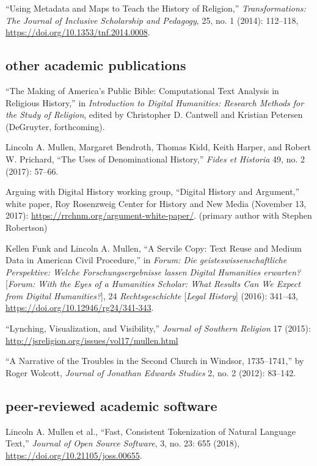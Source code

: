\documentclass[11pt]{article}
\begin{document}
``Using Metadata and Maps to Teach the History of Religion,'' \emph{Transformations: The Journal of Inclusive Scholarship and Pedagogy}, 25, no. 1 (2014): 112--118, \url{https://doi.org/10.1353/tnf.2014.0008}.

\subsection{other academic publications}\label{other-academic}

``The Making of America's Public Bible: Computational Text Analysis in 
Religious History,'' in \emph{Introduction to Digital Humanities: Research 
Methods for the Study of Religion}, edited by Christopher D. Cantwell and 
Kristian Petersen (DeGruyter, forthcoming).

Lincoln A. Mullen, Margaret Bendroth, Thomas Kidd, Keith Harper, and Robert W. 
Prichard, ``The Uses of Denominational History,'' \emph{Fides et Historia} 49, 
no. 2 (2017): 57--66.

Arguing with Digital History working group, ``Digital History and Argument,'' 
white paper, Roy Rosenzweig Center for History and New Media (November 13, 
2017): \url{https://rrchnm.org/argument-white-paper/}. (primary author with 
     Stephen Robertson)

Kellen Funk and Lincoln A. Mullen, ``A Servile Copy: Text Reuse and Medium Data 
in American Civil Procedure,'' in \emph{Forum: Die geisteswissenschaftliche 
  Perspektive: Welche Forschungsergebnisse lassen Digital Humanities 
  erwarten?} [\emph{Forum: With the Eyes of a Humanities Scholar: What Results 
  Can We Expect from Digital Humanities?}], 24 \emph{Rechtsgeschichte} 
[\emph{Legal History}] (2016): 341--43, 
\url{https://doi.org/10.12946/rg24/341-343}.

``Lynching, Visualization, and Visibility,'' \emph{Journal of Southern 
  Religion} 17 (2015): \url{http://jsreligion.org/issues/vol17/mullen.html}

``A Narrative of the Troubles in the Second Church in Windsor,
1735--1741,'' by Roger Wolcott, \emph{Journal of Jonathan Edwards
  Studies} 2, no. 2 (2012): 83--142.

\subsection{peer-reviewed academic software}\label{academic-software}

Lincoln A. Mullen et al., ``Fast, Consistent Tokenization of Natural Language 
Text,'' \emph{Journal of Open Source Software}, 3, no. 23: 655 (2018), 
\url{https://doi.org/10.21105/joss.00655}.
\end{document}

